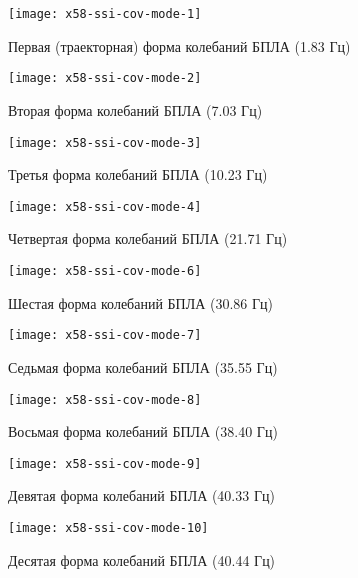 \begin{figure}[H]
	\centerfloat
	\texttt{[image: x58-ssi-cov-mode-1]}
	\caption{Первая (траекторная) форма колебаний БПЛА (1.83 Гц)} \label{x58-ssi-cov-mode-1}
\end{figure}

\begin{figure}[H]
	\centerfloat
	\texttt{[image: x58-ssi-cov-mode-2]}
	\caption{Вторая форма колебаний БПЛА (7.03 Гц)} \label{x58-ssi-cov-mode-2}
\end{figure}

\begin{figure}[H]
	\centerfloat
	\texttt{[image: x58-ssi-cov-mode-3]}
	\caption{Третья форма колебаний БПЛА (10.23 Гц)} \label{x58-ssi-cov-mode-3}
\end{figure}

\begin{figure}[H]
	\centerfloat
	\texttt{[image: x58-ssi-cov-mode-4]}
	\caption{Четвертая форма колебаний БПЛА (21.71 Гц)} \label{x58-ssi-cov-mode-4}
\end{figure}

\begin{figure}[H]
	\centerfloat
	\texttt{[image: x58-ssi-cov-mode-6]}
	\caption{Шестая форма колебаний БПЛА (30.86 Гц)} \label{x58-ssi-cov-mode-6}
\end{figure}

\begin{figure}[H]
	\centerfloat
	\texttt{[image: x58-ssi-cov-mode-7]}
	\caption{Седьмая форма колебаний БПЛА (35.55 Гц)} \label{x58-ssi-cov-mode-7}
\end{figure}

\begin{figure}[H]
	\centerfloat
	\texttt{[image: x58-ssi-cov-mode-8]}
	\caption{Восьмая форма колебаний БПЛА (38.40 Гц)} \label{x58-ssi-cov-mode-8}
\end{figure}

\begin{figure}[H]
	\centerfloat
	\texttt{[image: x58-ssi-cov-mode-9]}
	\caption{Девятая форма колебаний БПЛА (40.33 Гц)} \label{x58-ssi-cov-mode-9}
\end{figure}

\begin{figure}[H]
	\centerfloat
	\texttt{[image: x58-ssi-cov-mode-10]}
	\caption{Десятая форма колебаний БПЛА (40.44 Гц)} \label{x58-ssi-cov-mode-10}
\end{figure}

